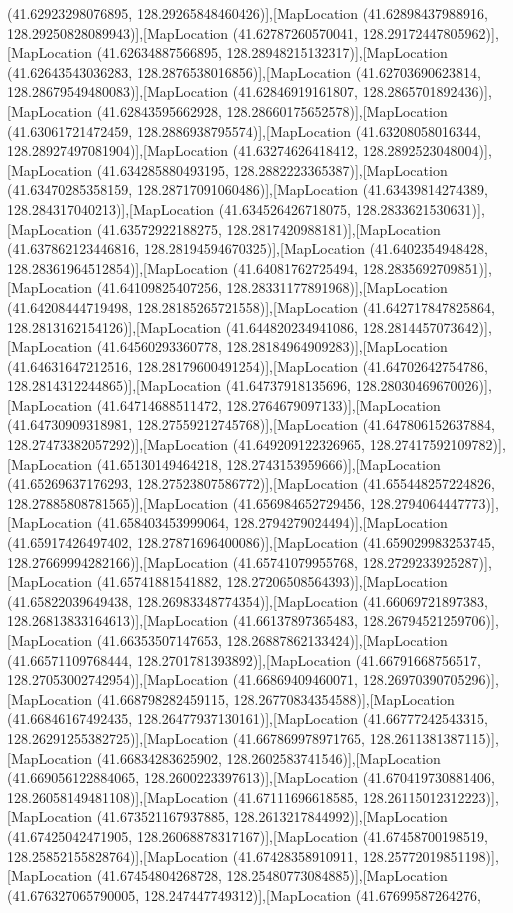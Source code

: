 (41.62923298076895, 128.29265848460426)],[MapLocation (41.62898437988916, 128.29250828089943)],[MapLocation (41.62787260570041, 128.29172447805962)],[MapLocation (41.62634887566895, 128.28948215132317)],[MapLocation (41.62643543036283, 128.2876538016856)],[MapLocation (41.62703690623814, 128.28679549480083)],[MapLocation (41.62846919161807, 128.2865701892436)],[MapLocation (41.62843595662928, 128.28660175652578)],[MapLocation (41.63061721472459, 128.2886938795574)],[MapLocation (41.63208058016344, 128.28927497081904)],[MapLocation (41.63274626418412, 128.2892523048004)],[MapLocation (41.634285880493195, 128.2882223365387)],[MapLocation (41.63470285358159, 128.28717091060486)],[MapLocation (41.63439814274389, 128.284317040213)],[MapLocation (41.634526426718075, 128.2833621530631)],[MapLocation (41.63572922188275, 128.2817420988181)],[MapLocation (41.637862123446816, 128.28194594670325)],[MapLocation (41.6402354948428, 128.28361964512854)],[MapLocation (41.64081762725494, 128.2835692709851)],[MapLocation (41.64109825407256, 128.28331177891968)],[MapLocation (41.64208444719498, 128.28185265721558)],[MapLocation (41.642717847825864, 128.2813162154126)],[MapLocation (41.644820234941086, 128.2814457073642)],[MapLocation (41.64560293360778, 128.28184964909283)],[MapLocation (41.64631647212516, 128.28179600491254)],[MapLocation (41.64702642754786, 128.2814312244865)],[MapLocation (41.64737918135696, 128.28030469670026)],[MapLocation (41.64714688511472, 128.2764679097133)],[MapLocation (41.64730909318981, 128.27559212745768)],[MapLocation (41.647806152637884, 128.27473382057292)],[MapLocation (41.649209122326965, 128.27417592109782)],[MapLocation (41.65130149464218, 128.2743153959666)],[MapLocation (41.65269637176293, 128.27523807586772)],[MapLocation (41.655448257224826, 128.27885808781565)],[MapLocation (41.656984652729456, 128.2794064447773)],[MapLocation (41.658403453999064, 128.2794279024494)],[MapLocation (41.65917426497402, 128.27871696400086)],[MapLocation (41.659029983253745, 128.27669994282166)],[MapLocation (41.65741079955768, 128.2729233925287)],[MapLocation (41.65741881541882, 128.27206508564393)],[MapLocation (41.65822039649438, 128.26983348774354)],[MapLocation (41.66069721897383, 128.26813833164613)],[MapLocation (41.66137897365483, 128.26794521259706)],[MapLocation (41.66353507147653, 128.26887862133424)],[MapLocation (41.66571109768444, 128.2701781393892)],[MapLocation (41.66791668756517, 128.27053002742954)],[MapLocation (41.66869409460071, 128.26970390705296)],[MapLocation (41.668798282459115, 128.26770834354588)],[MapLocation (41.66846167492435, 128.26477937130161)],[MapLocation (41.66777242543315, 128.26291255382725)],[MapLocation (41.667869978971765, 128.2611381387115)],[MapLocation (41.66834283625902, 128.2602583741546)],[MapLocation (41.669056122884065, 128.2600223397613)],[MapLocation (41.670419730881406, 128.26058149481108)],[MapLocation (41.67111696618585, 128.26115012312223)],[MapLocation (41.673521167937885, 128.2613217844992)],[MapLocation (41.67425042471905, 128.26068878317167)],[MapLocation (41.67458700198519, 128.25852155828764)],[MapLocation (41.67428358910911, 128.25772019851198)],[MapLocation (41.67454804268728, 128.25480773084885)],[MapLocation (41.676327065790005, 128.247447749312)],[MapLocation (41.67699587264276, 